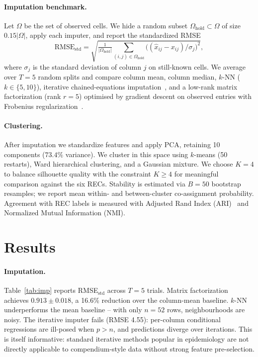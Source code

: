 \documentclass[runningheads]{llncs}
\begin{document}
\paragraph{Imputation benchmark.} Let $\Omega$ be the set of observed cells. We hide a random subset $\Omega_{\text{hold}} \subset \Omega$ of size $0.15|\Omega|$, apply each imputer, and report the standardized RMSE
\begin{equation}
\text{RMSE}_{\text{std}} = \sqrt{ \tfrac{1}{|\Omega_{\text{hold}}|} \sum_{(i,j) \in \Omega_{\text{hold}}} \!\big( (\hat{x}_{ij} - x_{ij}) / \sigma_j \big)^{2} },
\end{equation}
where $\sigma_j$ is the standard deviation of column $j$ on still-known cells. We average over $T=5$ random splits and compare column mean, column median, $k$-NN ($k\in\{5,10\}$), iterative chained-equations imputation~\cite{ref_mice}, and a low-rank matrix factorization (rank $r=5$) optimised by gradient descent on observed entries with Frobenius regularization~\cite{ref_mf}.

\paragraph{Clustering.} After imputation we standardize features and apply PCA, retaining 10 components ($73.4\%$ variance). We cluster in this space using $k$-means (50 restarts), Ward hierarchical clustering, and a Gaussian mixture. We choose $K=4$ to balance silhouette quality with the constraint $K \geq 4$ for meaningful comparison against the six RECs. Stability is estimated via $B=50$ bootstrap resamples; we report mean within- and between-cluster co-assignment probability. Agreement with REC labels is measured with Adjusted Rand Index (ARI)~\cite{ref_ari} and Normalized Mutual Information (NMI).

\section{Results}\label{sec:results}

\paragraph{Imputation.} Table~\ref{tab:imp} reports RMSE$_{\text{std}}$ across $T=5$ trials. Matrix factorization achieves $0.913 \pm 0.018$, a 16.6\% reduction over the column-mean baseline. $k$-NN underperforms the mean baseline -- with only $n{=}52$ rows, neighbourhoods are noisy. The iterative imputer fails (RMSE 4.55): per-column conditional regressions are ill-posed when $p > n$, and predictions diverge over iterations. This is itself informative: standard iterative methods popular in epidemiology are not directly applicable to compendium-style data without strong feature pre-selection.
\end{document}
